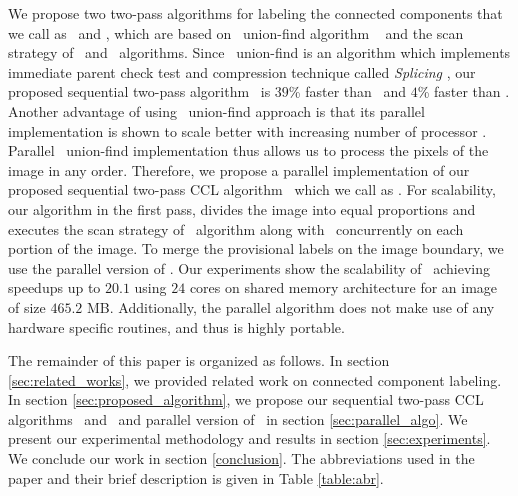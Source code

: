 
We propose two two-pass algorithms for labeling the connected components that we
call as \aremsp\ and \nremsp, which are based on \rems\ union-find algorithm
\remsp\ \cite{Patwary2010_RemSP, Dijkstra1976_RemSP} and the scan strategy of \arun\ and
\lrpc\ algorithms.
Since \rems\ union-find is an algorithm which implements immediate parent check test and 
compression technique called {\em Splicing} \cite{Patwary2010_RemSP,
Dijkstra1976_RemSP}, our proposed sequential two-pass algorithm \aremsp\ is $39$\% faster than \lrpc\
and $4$\% faster than \arun.
Another advantage of using \rems\ union-find approach is that its parallel implementation is shown to scale better
with increasing number of processor \cite{Patwary2012_PARemSP}. Parallel \rems\ union-find implementation thus allows us to
process the pixels of the image in any order. Therefore, we propose a parallel implementation of our proposed
sequential two-pass CCL algorithm \aremsp\ which we call as \paremsp. For
scalability, our algorithm in the first pass, divides the image into equal proportions and executes the scan strategy of \arun\ algorithm along with \remsp\
concurrently on each portion of the image. To merge the provisional labels on the image boundary, we use the parallel version
of \remsp \cite{Patwary2012_PARemSP}. Our experiments show
the scalability of \paremsp\ achieving speedups up to $20.1$ using $24$ cores
on shared memory architecture for an image of size $465.2$ MB.
Additionally, the parallel algorithm does not make use of any hardware specific routines, and thus is highly portable.

The remainder of this paper is organized as follows. In section
\ref{sec:related_works}, we provided related work on connected component labeling.
In section \ref{sec:proposed_algorithm}, we propose our sequential two-pass CCL
algorithms \nremsp\ and \aremsp\ and parallel version of \aremsp\ in section
\ref{sec:parallel_algo}.
We present our experimental methodology and results in section
\ref{sec:experiments}. We conclude our work in section
\ref{conclusion}. The abbreviations used in the paper and their brief
description is given in Table \ref{table:abr}.


